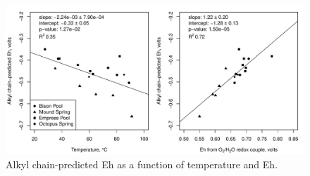 \singlespace
\begin{figure}[h]
\centering
\includegraphics[width=\linewidth]{"figs_ch2/scatterplot - alkyl chain predicted Eh"}
\caption[Alkyl chain-predicted Eh as a function of temperature and Eh]{Alkyl chain-predicted Eh as a function of temperature and Eh.}
\label{fig:alkyl_Eh}
\end{figure}
\doublespace